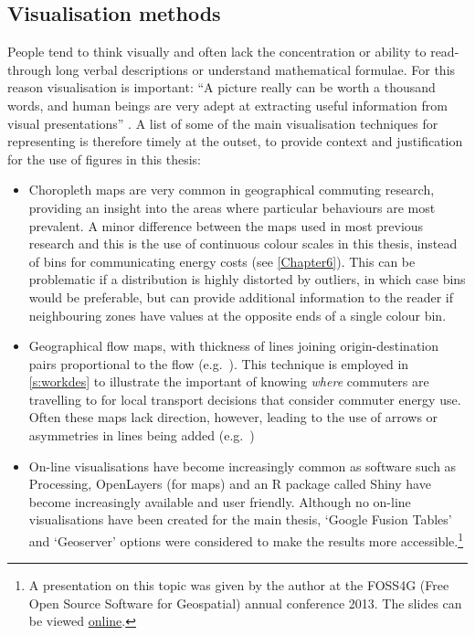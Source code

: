 \subsection{Visualisation methods}
People tend to think visually and often lack the concentration or ability
to read-through long verbal descriptions or understand mathematical formulae.
For this reason visualisation is important:
``A picture really can be worth a thousand words, and human beings are very adept
at extracting useful information from visual presentations'' \citep[p.~4]{kabacoff2011r}.
A list of some of the main visualisation techniques for representing
is therefore timely at the outset, to provide context and justification
for the use of figures in this thesis:
\begin{itemize}
 \item Choropleth maps are very common in geographical commuting research,
 providing an insight into the areas where particular behaviours are most
 prevalent. A minor difference between the maps used in most previous
 research and this is the use of continuous colour scales in this thesis,
 instead of bins for communicating energy costs (see \cref{Chapter6}).
 This can be problematic if a distribution is highly
 distorted by outliers, in which case bins would be preferable, but can provide
 additional information to the reader if neighbouring zones have values at the
 opposite ends of a single colour bin.
 \item Geographical flow maps, with thickness of lines joining origin-destination
 pairs proportional to the flow (e.g.~\citealp{Smith2009}).
 This technique is employed in \cref{s:workdes} to illustrate the important of
 knowing \emph{where} commuters are travelling to for local transport decisions
 that consider commuter energy use. Often these maps lack direction, however,
 leading to the use of arrows or asymmetries in lines being added
 (e.g.~\citep{Nielsen2008})
 \item On-line visualisations have become increasingly common as software such
 as Processing, OpenLayers (for maps) and an R package called Shiny have become
 increasingly available and user friendly. Although no on-line visualisations
 have been created for the main thesis, `Google Fusion Tables' and `Geoserver'
 options were considered to make the results more
 accessible.\footnote{A presentation
 on this topic was given by the author at the FOSS4G (Free Open Source
 Software for Geospatial) annual conference 2013.
 The slides can be viewed
 {\color{blue} \href{http://robinlovelace.net/visualisation/open\%20source/conferences/presentation/2013/09/22/foss4g-presentation.html}
 {online}}.
 }
\end{itemize}

